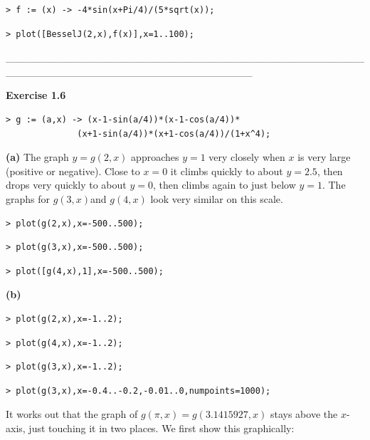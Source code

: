 \documentclass{article}
\begin{document}
\begin{lstlisting}
> f := (x) -> -4*sin(x+Pi/4)/(5*sqrt(x));
\end{lstlisting}
\begin{lstlisting}
> plot([BesselJ(2,x),f(x)],x=1..100);
\end{lstlisting}
\begin{Maple Normal}
\_\_\_\_\_\_\_\_\_\_\_\_\_\_\_\_\_\_\_\_\_\_\_\_\_\_\_\_\_\_\_\_\_\_\_\_\_\_\_\_\_\_\_\_\_\_\_\_\_\_\_\_\_\_\_\_\_\_\_\_\_\_\_\_\_\_\_\_\_\_\_\_\_\_\_\_\_\_\_\_\_
\end{Maple Normal}
\begin{Maple Heading 2}
\textbf{Exercise 1.6}
\end{Maple Heading 2}
\begin{lstlisting}
> g := (a,x) -> (x-1-sin(a/4))*(x-1-cos(a/4))*
              (x+1-sin(a/4))*(x+1-cos(a/4))/(1+x^4);
\end{lstlisting}
\begin{Maple Normal}
\textbf{(a)} The graph  
$y =g (2,x)$ approaches 
$y =1$ very closely when 
$x$ is very large (positive or negative).  Close to 
$x =0$ it climbs quickly to about 
$y = 2.5$, then drops very quickly to about 
$ y =0$, then climbs again to just below 
$y =1$.  The graphs for 
$g (3,x)$and 
$g (4,x)$ look very similar on this scale.
\end{Maple Normal}
\begin{lstlisting}
> plot(g(2,x),x=-500..500);
\end{lstlisting}
\begin{lstlisting}
> plot(g(3,x),x=-500..500);
\end{lstlisting}
\begin{lstlisting}
> plot([g(4,x),1],x=-500..500);
\end{lstlisting}
\begin{Maple Heading 2}
\textbf{(b)}
\end{Maple Heading 2}
\begin{lstlisting}
> plot(g(2,x),x=-1..2);
\end{lstlisting}
\begin{lstlisting}
> plot(g(4,x),x=-1..2);
\end{lstlisting}
\begin{lstlisting}
> plot(g(3,x),x=-1..2);
\end{lstlisting}
\begin{lstlisting}
> plot(g(3,x),x=-0.4..-0.2,-0.01..0,numpoints=1000);
\end{lstlisting}
\begin{Maple Normal}
It works out that the graph of 
$g (\pi,x)=g ( 3.1415927,x)$ stays above the 
$x$-axis, just touching it in two places.  We first show this graphically:
\end{Maple Normal}
\end{document}
